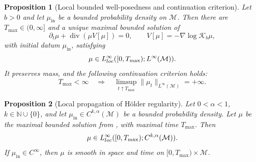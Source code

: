 \documentclass[10pt,a4paper]{amsart}
\newtheorem{proposition}{Proposition}
\def\M{\mathcal M}
\newcommand{\divg}{\operatorname{div}}
\begin{document}
\begin{proposition}[Local bounded well-posedness and continuation criterion]\label{prop:pde_local_bounded_wellposedness}
Let \(b>0\) and let \(\mu_{\mathrm{in}}\) be a bounded probability density on
 \(\M\).
Then there are \(T_{\max}\in(0,\infty]\) and a unique maximal bounded
solution of
\[
\partial_t\mu+\divg(\mu V[\mu])=0,\qquad V[\mu]=-\nabla\log \mathcal K_b\mu,
\]
with initial datum \(\mu_{\mathrm{in}}\), satisfying
\[
\mu\in L^\infty_{\rm loc}([0,T_{\max});L^\infty( \M)).
\]
It preserves mass, and the following continuation criterion holds:
\[
T_{\max}<\infty
\quad\Longrightarrow\quad
\limsup_{t\uparrow T_{\max}}\|\mu_t\|_{L^\infty( \M)}=+\infty .
\]
\end{proposition}

\begin{proposition}[Local propagation of Hölder regularity]\label{prop:pde_holder_propagation}
Let \(0<\alpha<1\), \(k\in\mathbb N\cup\{0\}\), and let
    \(\mu_{\mathrm{in}}\in C^{k,\alpha}( \M)\) be a bounded probability density.
Let \(\mu\) be the maximal bounded solution from
, with maximal time
\(T_{\max}\).  Then
\[
\mu\in L^\infty_{\rm loc}([0,T_{\max});C^{k,\alpha}( \M)).
\]
If \(\mu_{\mathrm{in}}\in C^\infty\), then \(\mu\) is smooth in space and time on
\([0,T_{\max})\times \M\).
\end{proposition}
\end{document}
